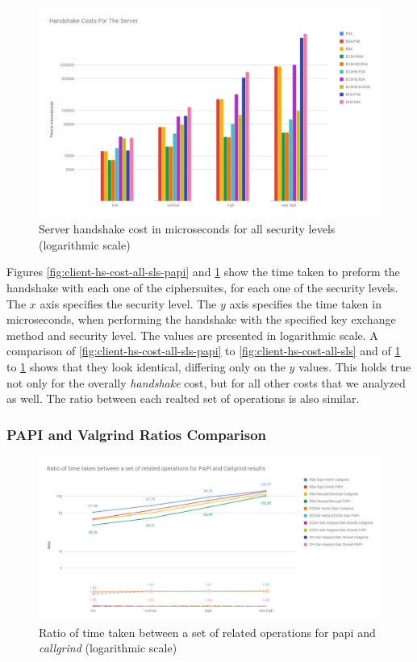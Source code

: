 \begin{figure}
  \centering
  \includegraphics[width=1.0\textwidth]{img/hs_papi_server.png}
  \centering \caption{\label{fig:server-hs-cost-all-sls-papi} Server handshake cost in microseconds for all security levels (logarithmic scale)}
\end{figure}

Figures \ref{fig:client-hs-cost-all-sls-papi} and \ref{fig:server-hs-cost-all-sls-papi} show the time taken to preform the handshake with each one
of the ciphersuites, for each one of the security levels. The $x$ axis specifies the security level. The $y$ axis specifies the time taken in microseconds,
when performing the handshake with the specified key exchange method and security level. The values are presented in logarithmic scale. A comparison of
\ref{fig:client-hs-cost-all-sls-papi} to \ref{fig:client-hs-cost-all-sls} and of \ref{fig:server-hs-cost-all-sls-papi} to \ref{fig:server-hs-cost-all-sls-papi} shows that they look identical,
differing only on the $y$ values. This holds true not only for the overally \textit{handshake} cost, but for all other costs that we analyzed as well. The ratio between
each realted set of operations is also similar.

\subsubsection{PAPI and Valgrind Ratios Comparison} \label{sec:papi-valgrind-ratios}


\begin{figure}
  \centering
  \includegraphics[width=1.0\textwidth]{img/papi-ratio.png}
  \centering \caption{\label{fig:papi-operations-ratio} Ratio of time taken between a set of related operations for \gls{papi} and \textit{callgrind} (logarithmic scale)}
\end{figure}

